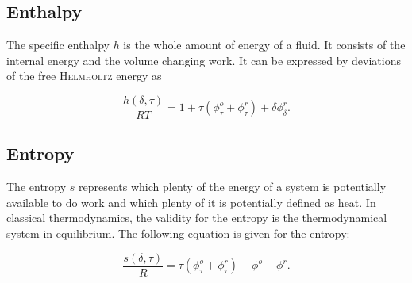 \subsection{Enthalpy}

The specific enthalpy $h$ is the whole amount of energy of a fluid. It consists of the internal energy and the volume changing work. It can be expressed by deviations of the free \textsc{Helmholtz} energy as

\begin{equation}
\frac{h(\delta,\tau)}{RT}=1+\tau\left(\phi^o_\tau+\phi^r_\tau\right)+\delta\phi^r_\delta.
\label{eq-fhe-enthalpy}
\end{equation}



\subsection{Entropy}

The entropy $s$ represents which plenty of the energy of a system is potentially available to do work and which plenty of it is potentially defined as heat. In classical thermodynamics, the validity for the entropy is the thermodynamical system in equilibrium. The following equation is given for the entropy:

\begin{equation}
\frac{s(\delta,\tau)}{R}=\tau\left(\phi^o_\tau+\phi^r_\tau\right)-\phi^o-\phi^r.
\label{eq-fhe-entropy}
\end{equation}
